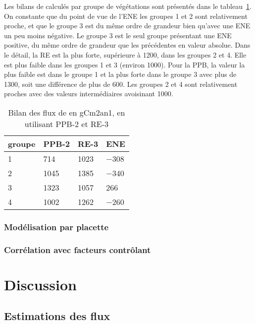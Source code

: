 Les bilans de \coo calculés par groupe de végétations sont présentés dans le tableau~\ref{table:bdc_grp}.
On constante que du point de vue de l'ENE les groupes 1 et 2 sont relativement proche, et que le groupe 3 est du même ordre de grandeur bien qu'avec une ENE un peu moins négative.
Le groupe 3 est le seul groupe présentant une ENE positive, du même ordre de grandeur que les précédentes en valeur absolue.
Dans le détail, la RE est la plus forte, supérieure à \SI{1200}{\gcma}, dans les groupes 2 et 4.
Elle est plus faible dans les groupes 1 et 3 (environ \SI{1000}{\gcma}).
Pour la PPB, la valeur la plus faible est dans le groupe 1 et la plus forte dans le groupe 3 avec plus de \SI{1300}{\gcma}, soit une différence de plus de \SI{600}{\gcma}.
Les groupes 2 et 4 sont relativement proches avec des valeurs intermédiaires avoisinant \SI{1000}{\gcma}.

\begin{table}
\centering
\caption{Bilan des flux de \coo en gCm2an1, en utilisant PPB-2 et RE-3}
\label{table:bdc_grp}
\begin{tabular}{llll}\toprule
groupe & PPB-2 & RE-3 & ENE \\ \midrule
1 &  \num{714} & \num{1023} & \num{-308} \\
2 &  \num{1045} & \num{1385} & \num{-340} \\
3 &  \num{1323} & \num{1057} & \num{266} \\
4 &  \num{1002} & \num{1262} & \num{-260} \\
\bottomrule
\end{tabular}
\end{table}

\subsubsection{Modélisation par placette}

\subsubsection{Corrélation avec facteurs contrôlant}

\section{Discussion}

\subsection{Estimations des flux}

